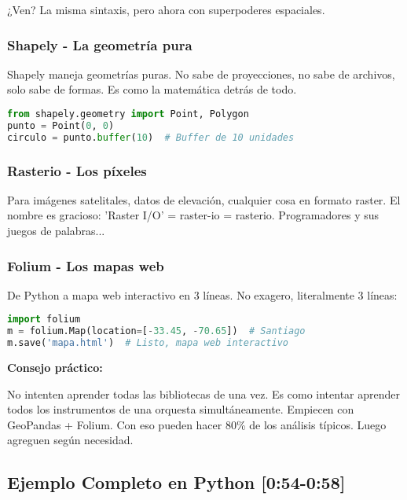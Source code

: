 \documentclass[11pt,a4paper]{article}
\newcommand{\tiempo}[1]{\textcolor{timecolor}{\faIcon{clock} \textbf{[#1]}}}
\newcommand{\decir}[1]{\begin{tcolorbox}[colback=blue!5,colframe=usachblue,title={\faIcon{microphone} DECIR}]#1\end{tcolorbox}}
\begin{document}
\decir{¿Ven? La misma sintaxis, pero ahora con superpoderes espaciales.}

\subsubsection{Shapely - La geometría pura}

\decir{Shapely maneja geometrías puras. No sabe de proyecciones, no sabe de archivos, solo sabe de formas. Es como la matemática detrás de todo.}

\begin{lstlisting}[language=Python]
from shapely.geometry import Point, Polygon
punto = Point(0, 0)
circulo = punto.buffer(10)  # Buffer de 10 unidades
\end{lstlisting}

\subsubsection{Rasterio - Los píxeles}

\decir{Para imágenes satelitales, datos de elevación, cualquier cosa en formato raster. El nombre es gracioso: 'Raster I/O' = raster-io = rasterio. Programadores y sus juegos de palabras...}

\subsubsection{Folium - Los mapas web}

\decir{De Python a mapa web interactivo en 3 líneas. No exagero, literalmente 3 líneas:}

\begin{lstlisting}[language=Python]
import folium
m = folium.Map(location=[-33.45, -70.65])  # Santiago
m.save('mapa.html')  # Listo, mapa web interactivo
\end{lstlisting}

\textbf{Consejo práctico:}

\decir{No intenten aprender todas las bibliotecas de una vez. Es como intentar aprender todos los instrumentos de una orquesta simultáneamente. Empiecen con GeoPandas + Folium. Con eso pueden hacer 80\% de los análisis típicos. Luego agreguen según necesidad.}

\subsection{Ejemplo Completo en Python \tiempo{0:54-0:58}}
\end{document}
